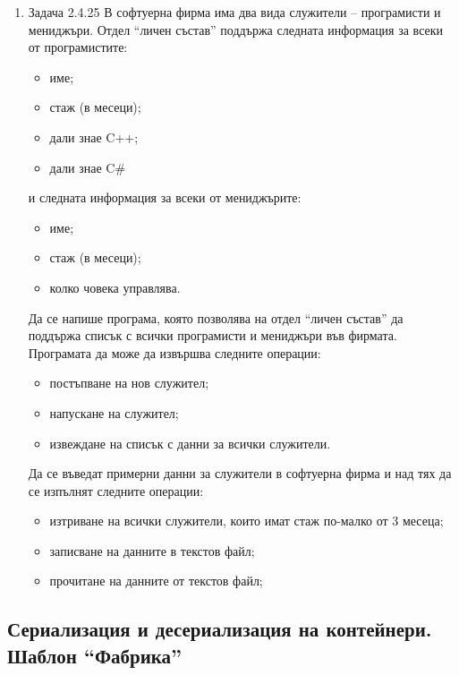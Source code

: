 \begin{enumerate}
    \item Задача 2.4.25\cite{sbornik2} В софтуерна фирма има два вида служители – програмисти и мениджъри. Отдел ``личен състав'' поддържа следната информация за всеки от програмистите:
    \begin{itemize}
      \item име;
      \item стаж (в месеци);
      \item дали знае C++;
      \item дали знае C\#
    \end{itemize}
    и следната информация за всеки от мениджърите:
    \begin{itemize}
      \item име;
      \item стаж (в месеци);
      \item колко човека управлява.
    \end{itemize}

    Да се напише програма, която позволява на отдел ``личен състав'' да поддържа списък с всички програмисти и мениджъри във фирмата. Програмата да може да извършва следните операции:
    \begin{itemize}
      \item постъпване на нов служител;
      \item напускане на служител;
      \item извеждане на списък с данни за всички служители.
    \end{itemize}

    Да се въведат примерни данни за служители  в софтуерна фирма и над тях да се изпълнят следните операции:

    \begin{itemize}
      \item изтриване на всички служители, които имат стаж по-малко от 3 месеца;
      \item записване на данните в текстов файл;
      \item прочитане на данните от текстов файл;
    \end{itemize}

\end{enumerate}

\pagebreak

\subsection{Сериализация и десериализация на контейнери. Шаблон ``Фабрика''}

